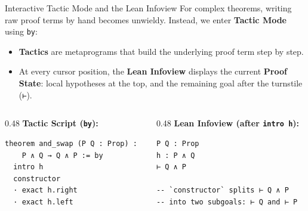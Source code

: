 \documentclass[aspectratio=169, 10pt]{beamer}
\begin{document}
\begin{frame}[fragile]{Interactive Tactic Mode and the Lean Infoview}
  For complex theorems, writing raw proof terms by hand becomes unwieldy. Instead, we enter \textbf{Tactic Mode} using \texttt{by}:
  \begin{itemize}
    \item \textbf{Tactics} are metaprograms that build the underlying proof term step by step.
    \item At every cursor position, the \textbf{Lean Infoview} displays the current \textbf{Proof State}: local hypotheses at the top, and the remaining goal after the turnstile (\texttt{⊢}).
  \end{itemize}

  \vspace{0.1cm}
  \begin{columns}[T]
    \begin{column}{0.48\textwidth}
      \textbf{Tactic Script (\texttt{by}):}
\begin{lstlisting}[language=Lean4]
theorem and_swap (P Q : Prop) :
    P ∧ Q → Q ∧ P := by
  intro h
  constructor
  · exact h.right
  · exact h.left
\end{lstlisting}
    \end{column}

    \begin{column}{0.48\textwidth}
      \textbf{Lean Infoview (after \texttt{intro h}):}
\begin{lstlisting}[language=Lean4]
P Q : Prop
h : P ∧ Q
⊢ Q ∧ P

-- `constructor` splits ⊢ Q ∧ P
-- into two subgoals: ⊢ Q and ⊢ P
\end{lstlisting}
    \end{column}
  \end{columns}
\end{frame}
\end{document}
